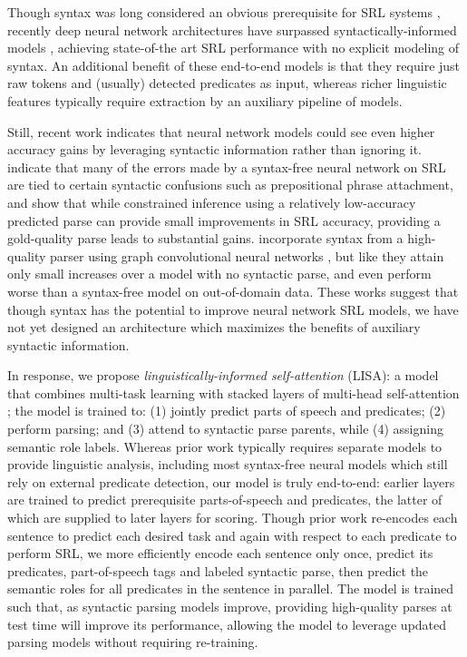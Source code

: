 \documentclass[11pt,a4paper]{article}
\begin{document}
Though syntax was long considered an obvious prerequisite for SRL systems \citep{levin1993english,punyakanok2008importance}, recently deep neural network architectures have surpassed syntactically-informed models \citep{zhou2015end, marcheggiani2017simple, he2017deep, tan2018deep, he2018jointly}, achieving state-of-the art SRL performance with no explicit modeling of syntax. 
An additional benefit of these end-to-end models is that they require just raw tokens and (usually) detected predicates as input, whereas richer linguistic features typically require extraction by an auxiliary pipeline of models.

Still, recent work \citep{roth2016neural,he2017deep,marcheggiani2017encoding} indicates that neural network models could see even higher accuracy gains by leveraging syntactic information rather than ignoring it. \citet{he2017deep} indicate that many of the errors made by a syntax-free neural network on SRL are tied to certain syntactic confusions such as prepositional phrase attachment, and show that while constrained inference using a relatively low-accuracy predicted parse can provide small improvements in SRL accuracy, providing a gold-quality parse leads to substantial gains. \citet{marcheggiani2017encoding} incorporate syntax from a high-quality parser \citep{kiperwasser2016simple} using graph convolutional neural networks \citep{kipf2017semi}, but like \citet{he2017deep} they attain only small increases over a model with no syntactic parse, and even perform worse than a syntax-free model on out-of-domain data. These works suggest that though syntax has the potential to improve neural network SRL models, we have not yet designed an architecture which maximizes the benefits of auxiliary syntactic information. 

In response, we propose \emph{linguistically-informed self-attention} (LISA): a model that combines multi-task learning \citep{caruana1993multitask} with stacked layers of multi-head self-attention \citep{vaswani2017attention}; the model is trained to: (1) jointly predict parts of speech and predicates; (2) perform parsing; and (3) attend to syntactic parse parents, while (4) assigning semantic role labels. Whereas prior work typically requires separate models to provide linguistic analysis, including most syntax-free neural models which still rely on external predicate detection, our model is truly end-to-end: earlier layers are trained to predict prerequisite parts-of-speech and predicates, the latter of which are supplied to later layers for scoring. Though prior work re-encodes each sentence to predict each desired task and again with respect to each predicate to perform SRL,
we more efficiently encode each sentence only once, predict its predicates, part-of-speech tags and labeled syntactic parse, then predict the semantic roles for all predicates in the sentence in parallel. The model is trained such that, as syntactic parsing models improve, providing high-quality parses at test time will improve its performance, allowing the model to leverage updated parsing models without requiring re-training. 
\end{document}
